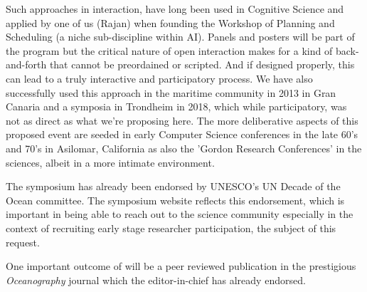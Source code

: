 \noindent
Such approaches in interaction, have long been used in Cognitive
Science and applied by one of us (Rajan) when founding the \nas
Workshop of Planning and Scheduling (a niche sub-discipline within
AI). Panels and posters will be part of the program but the critical
nature of open interaction makes for a kind of back-and-forth that
cannot be preordained or scripted. And if designed properly, this can
lead to a truly interactive and participatory process. We have also
successfully used this approach in the maritime community in 2013 in
Gran Canaria and a symposia in Trondheim in 2018, which while
participatory, was not as direct as what we're proposing here. The
more deliberative aspects of this proposed event are seeded in early
Computer Science conferences in the late 60's and 70's in Asilomar,
California as also the 'Gordon Research Conferences' in the sciences,
albeit in a more intimate environment.

The symposium has already been endorsed by UNESCO's UN Decade of the
Ocean committee. The symposium website reflects this endorsement,
which is important in being able to reach out to the science community
especially in the context of recruiting early stage researcher
participation, the subject of this request.

One important outcome of \symp will be a peer reviewed publication in
the prestigious \emph{Oceanography} journal which the editor-in-chief
has already endorsed.\\
